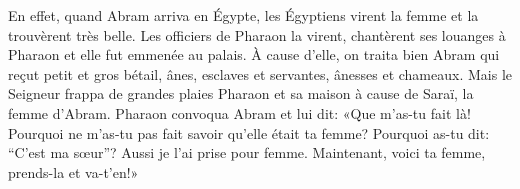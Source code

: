En effet, quand Abram arriva en Égypte,
	les Égyptiens virent la femme et la trouvèrent très belle.
Les officiers de Pharaon la virent, chantèrent ses louanges à Pharaon
	et elle fut emmenée au palais.
À cause d’elle, on traita bien Abram
	qui reçut petit et gros bétail, ânes, esclaves et servantes, ânesses et chameaux.
Mais le Seigneur frappa de grandes plaies Pharaon et sa maison
	à cause de Saraï, la femme d’Abram.
Pharaon convoqua Abram et lui dit:
	«Que m’as-tu fait là!
	Pourquoi ne m’as-tu pas fait savoir qu’elle était ta femme?
	Pourquoi as-tu dit: “C’est ma sœur”?
	Aussi je l’ai prise pour femme.
Maintenant, voici ta femme, prends-la et va-t’en!»
